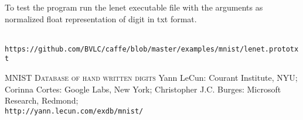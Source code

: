 \documentclass{article}
\begin{document}
To test the program run the lenet executable file with the arguments as normalized float representation of digit in txt format.

\begin{thebibliography}{9}
\\\texttt{https://github.com/BVLC/caffe/blob/master/examples/mnist/lenet.prototxt}
 
\textsc{MNIST Database of hand written digits}
Yann LeCun: Courant Institute, NYU;
Corinna Cortes: Google Labs, New York;
Christopher J.C. Burges: Microsoft Research, Redmond;
\\\texttt{http://yann.lecun.com/exdb/mnist/}
\end{thebibliography}
\end{document}
